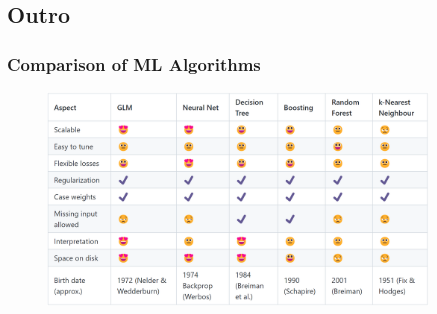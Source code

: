 \subsection{Outro}

\begin{frame}
	\frametitle{Comparison of ML Algorithms}
	\begin{figure}
		\includegraphics[width=0.9\textwidth]{pics/algorithms.png}
	\end{figure}
\end{frame}